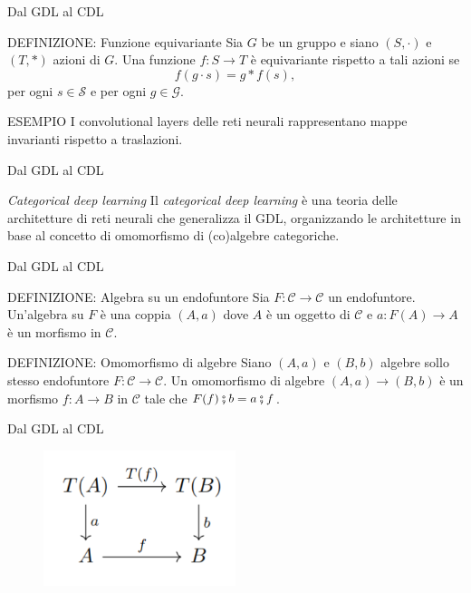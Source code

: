 \documentclass{beamer}
\begin{document}
\begin{frame}{Dal GDL al CDL}
    \begin{block}{DEFINIZIONE: Funzione equivariante}
        Sia $G$ be un gruppo e siano $(S, \cdot)$ e $(T, \ast)$ azioni di $G$. Una funzione $f: S \to T$ è equivariante rispetto a tali azioni se 
        \[f(g \cdot s) = g \ast f(s),\] 
        per ogni $s \in \mathcal{S}$ e per ogni $g \in \mathcal{G}$.
    \end{block}

    \begin{block}{ESEMPIO}
        I convolutional layers delle reti neurali rappresentano mappe invarianti rispetto a traslazioni.
    \end{block}
\end{frame}

\begin{frame}{Dal GDL al CDL}
    \begin{block}{\textit{Categorical deep learning}}
        Il \textit{categorical deep learning} è una teoria delle architetture di reti neurali che generalizza il GDL, organizzando le architetture in base al concetto di omomorfismo di (co)algebre categoriche.
    \end{block}
\end{frame}

\begin{frame}{Dal GDL al CDL}
    \begin{block}{DEFINIZIONE: Algebra su un endofuntore}
        Sia $F: \mathcal{C} \to \mathcal{C}$ un endofuntore. Un'algebra su $F$ è una coppia $(A,a)$ dove $A$ è un oggetto di $\mathcal{C}$ e $a: F(A) \to A$ è un morfismo in $\mathcal{C}$.
    \end{block}

    \begin{block}{DEFINIZIONE: Omomorfismo di algebre}
        Siano $(A,a)$ e $(B,b)$ algebre sollo stesso endofuntore $F: \mathcal{C} \to \mathcal{C}$. Un omomorfismo di algebre $(A,a) \to (B,b)$ è un morfismo $f: A \to B$ in $\mathcal{C}$ tale che $F(f) \fatsemi b =  a \fatsemi f$.
    \end{block}
\end{frame}

\begin{frame}{Dal GDL al CDL}
    \begin{figure}
        \begin{center}
            \includegraphics[width=0.5\textwidth]{figures/algebra_hom.png}
            \caption*{}
        \end{center}
    \end{figure}
\end{frame}
\end{document}
